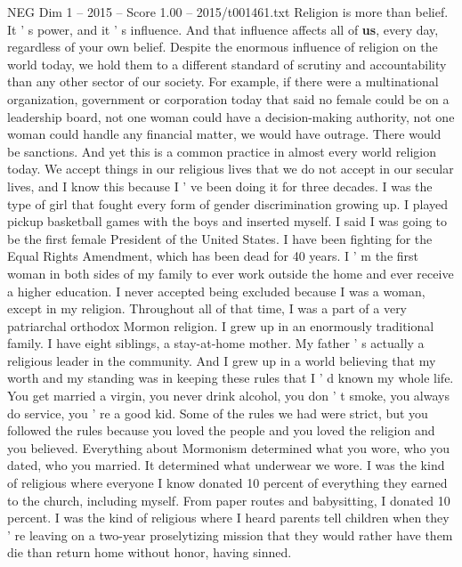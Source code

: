 \begin{textsample}{NEG Dim 1 – 2015 – Score 1.00 – 2015/t001461.txt}  \label{ex:f1_neg_040}
Religion is more than belief.
It ' s power, and it ' s influence.
And that influence affects all of \textbf{us}, every day, regardless of your own belief.
Despite the enormous influence of religion on the world today, we hold them to a different standard of scrutiny and accountability than any other sector of our society.
For example, if there were a multinational organization, government or corporation today that said no female could be on a leadership board, not one woman could have a decision-making authority, not one woman could handle any financial matter, we would have outrage.
There would be sanctions.
And yet this is a common practice in almost every world religion today.
We accept things in our religious lives that we do not accept in our secular lives, and I know this because I ' ve been doing it for three decades.
I was the type of girl that fought every form of gender discrimination growing up.
I played pickup basketball games with the boys and inserted myself.
I said I was going to be the first female President of the United States.
I have been fighting for the Equal Rights Amendment, which has been dead for 40 years.
I ' m the first woman in both sides of my family to ever work outside the home and ever receive a higher education.
I never accepted being excluded because I was a woman, except in my religion.
Throughout all of that time, I was a part of a very patriarchal orthodox Mormon religion.
I grew up in an enormously traditional family.
I have eight siblings, a stay-at-home mother.
My father ' s actually a religious leader in the community.
And I grew up in a world believing that my worth and my standing was in keeping these rules that I ' d known my whole life.
You get married a virgin, you never drink alcohol, you don ' t smoke, you always do service, you ' re a good kid.
Some of the rules we had were strict, but you followed the rules because you loved the people and you loved the religion and you believed.
Everything about Mormonism determined what you wore, who you dated, who you married.
It determined what underwear we wore.
I was the kind of religious where everyone I know donated 10 percent of everything they earned to the church, including myself.
From paper routes and babysitting, I donated 10 percent.
I was the kind of religious where I heard parents tell children when they ' re leaving on a two-year proselytizing mission that they would rather have them die than return home without honor, having sinned.

\end{textsample}
